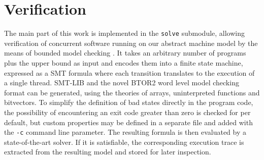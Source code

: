 \newcommand{\SMTLIB}{SMT-LIB }

\section{Verification}

The main part of this work is implemented in the \texttt{solve} submodule,
allowing verification of concurrent software running on our abstract machine model by the means of bounded model checking \cite{ref:BMC}.
It takes an arbitrary number of programs plus the upper bound as input and encodes them into a finite state machine, expressed as a SMT formula where each transition translates to the execution of a single thread.
\SMTLIB \cite{ref:SMT-Lib} and the novel BTOR2 \cite{ref:BTOR2} word level model checking format can be generated, using the theories of arrays, uninterpreted functions and bitvectors.
To simplify the definition of bad states directly in the program code, the possibility of encountering an exit code greater than zero is checked for per default, but custom properties may be defined in a separate file and added with the \texttt{-c} command line parameter.
The resulting formula is then evaluated by a state-of-the-art solver.
If it is satisfiable, the corresponding execution trace is extracted from the resulting model and stored for later inspection.


